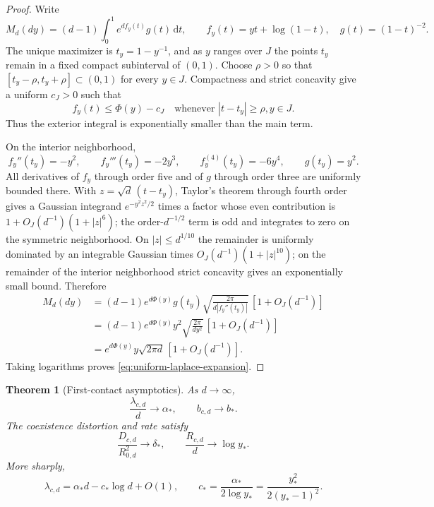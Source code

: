 \documentclass[11pt,a4paper]{article}
\newtheorem{theorem}{Theorem}[section]
\theoremstyle{remark}
\newcommand{\dd}{\,\mathrm{d}}
\begin{document}
\begin{proof}
Write
\begin{equation}
 M_d(dy)=(d-1)\int_0^1 e^{d f_y(t)}g(t)\dd t,
 \qquad f_y(t)=yt+\log(1-t),\quad g(t)=(1-t)^{-2}.
\end{equation}
The unique maximizer is $t_y=1-y^{-1}$, and as $y$ ranges over $J$ the
points $t_y$ remain in a fixed compact subinterval of $(0,1)$.  Choose
$\rho>0$ so that $[t_y-\rho,t_y+\rho]\subset(0,1)$ for every $y\in J$.
Compactness and strict concavity give a uniform $c_J>0$ such that
\begin{equation}
 f_y(t)\le\Phi(y)-c_J
 \quad\text{whenever }|t-t_y|\ge\rho, y\in J.
 \label{eq:uniform-laplace-tail}
\end{equation}
Thus the exterior integral is exponentially smaller than the main term.

On the interior neighborhood,
\begin{equation}
 f_y''(t_y)=-y^2,\qquad f_y'''(t_y)=-2y^3,\qquad
 f_y^{(4)}(t_y)=-6y^4,\qquad g(t_y)=y^2.
\end{equation}
All derivatives of $f_y$ through order five and of $g$ through order three
are uniformly bounded there.  With $z=\sqrt d\,(t-t_y)$, Taylor's theorem
through fourth order gives a Gaussian integrand
$e^{-y^2z^2/2}$ times a factor whose even contribution is
$1+O_J(d^{-1})(1+|z|^6)$; the order-$d^{-1/2}$ term is odd and integrates to
zero on the symmetric neighborhood.  On
$|z|\le d^{1/10}$ the remainder is uniformly dominated by an integrable
Gaussian times $O_J(d^{-1})(1+|z|^{10})$; on the remainder of the interior
neighborhood strict concavity gives an exponentially small bound.  Therefore
\begin{align}
 M_d(dy)
 &=(d-1)e^{d\Phi(y)}g(t_y)
   \sqrt{\frac{2\pi}{d|f_y''(t_y)|}}\,[1+O_J(d^{-1})]\\
 &=(d-1)e^{d\Phi(y)}y^2
   \sqrt{\frac{2\pi}{dy^2}}\,[1+O_J(d^{-1})]\\
 &=e^{d\Phi(y)}y\sqrt{2\pi d}\,[1+O_J(d^{-1})].
\end{align}
Taking logarithms proves \eqref{eq:uniform-laplace-expansion}.
\end{proof}

\begin{theorem}[First-contact asymptotics]
\label{thm:first-contact}
As $d\to\infty$,
\begin{equation}
 \frac{\lambda_{c,d}}d\to\alpha_*,
 \qquad b_{c,d}\to b_*.
 \label{eq:first-contact-limit}
\end{equation}
The coexistence distortion and rate satisfy
\begin{equation}
 \frac{D_{c,d}}{R_{0,d}^2}\to\delta_*,
 \qquad \frac{R_{c,d}}d\to\log y_*.
 \label{eq:contact-rate-distortion}
\end{equation}
More sharply,
\begin{equation}
 \boxed{\lambda_{c,d}=\alpha_*d-c_*\log d+O(1)},
 \qquad
 c_*=\frac{\alpha_*}{2\log y_*}
    =\frac{y_*^2}{2(y_*-1)^2}.
 \label{eq:log-correction}
\end{equation}
\end{theorem}
\end{document}
